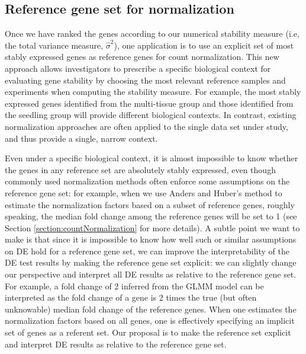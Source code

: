 				
				\subsection{Reference gene set for normalization}
				\label{Section:commonReference}
				
				Once we have ranked the genes according to our numerical stability measure
				(i.e, the total variance measure, $\hat\sigma^2$), one application is to use
				an explicit set of most stably expressed genes as reference genes for count
				normalization.  This new approach allows investigators to prescribe a specific
				biological context for evaluating gene stability by choosing the most relevant
				reference samples and experiments when computing the stability measure.  For
				example, the most stably expressed genes identified from the multi-tissue
				group and those identified from the seedling group will provide different
				biological contexts. In contrast, existing normalization approaches are often
				applied to the single data set under study, and thus provide a single, narrow
				context.
				
				
				Even under a specific biological context,  it is almost impossible to know
				whether the genes in any reference set are absolutely stably expressed, even
				though commonly used normalization methods often enforce some assumptions on
				the reference gene set: for example, when we use Anders and Huber's
				method to estimate the normalization factors based on a subset of reference
				genes, roughly speaking, the median fold change among the reference genes will
				be set to 1 (see Section \ref{section:countNormalization} for more details). A
				subtle point we want to make is that since it is impossible to know how well
				such or similar assumptions on DE hold for a reference gene set,
				we can improve the interpretability of the DE test results by making the
				reference gene set explicit:  we can slightly change our perspective and
				interpret all DE results as relative to the reference gene set.  
				For example, a fold change of 2 inferred from the GLMM model can be
				interpreted as the fold change of a gene is 2 times the true (but often
				unknowable) median fold change of the reference genes.  
				When one estimates the normalization factors based on all genes, one is
				effectively specifying an implicit set of genes as a referent set.  Our
				proposal is to make the reference set explicit and interpret DE results as
				relative to the reference gene set.
				
